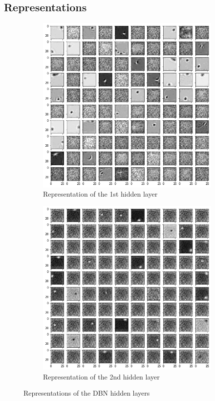\documentclass[a4paper, 11pt]{article}
\begin{document}
		\subsection{Representations}
			\begin{figure}[H]
				\begin{subfigure}{.49\textwidth}
					\centering
					\includegraphics[width=.99\linewidth]{0.1_1.png}  
					\caption{Representation of the 1st hidden layer}
					\label{fig:rep1}
				\end{subfigure}
				\begin{subfigure}{.49\textwidth}
					\centering
					\includegraphics[width=.99\linewidth]{0.1_2.png}  
					\caption{Representation of the 2nd hidden layer}
					\label{fig:rep2}
				\end{subfigure}
				\caption{Representations of the DBN hidden layers}
				\label{fig:rep}
			\end{figure}
\end{document}
